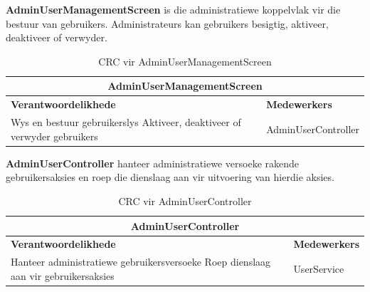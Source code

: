 \textbf{AdminUserManagementScreen} is die administratiewe koppelvlak vir die bestuur van gebruikers. Administrateurs kan gebruikers besigtig, aktiveer, deaktiveer of verwyder.

\begin{table}[H]
\centering
\begin{tabular}{|p{}|p{}|}
    \hline
    \multicolumn{2}{|c|}{\textbf{AdminUserManagementScreen}} \\
    \hline
    \textbf{Verantwoordelikhede} & \textbf{Medewerkers} \\
    \hline
    Wys en bestuur gebruikerslys \newline
    Aktiveer, deaktiveer of verwyder gebruikers
    &
    AdminUserController \\
    \hline
\end{tabular}
\caption{CRC vir AdminUserManagementScreen}
\label{tab:crc_admin_user_management_screen}
\end{table}
\vspace{1em}

\textbf{AdminUserController} hanteer administratiewe versoeke rakende gebruikersaksies en roep die dienslaag aan vir uitvoering van hierdie aksies.

\begin{table}[H]
\centering
\begin{tabular}{|p{}|p{}|}
    \hline
    \multicolumn{2}{|c|}{\textbf{AdminUserController}} \\
    \hline
    \textbf{Verantwoordelikhede} & \textbf{Medewerkers} \\
    \hline
    Hanteer administratiewe gebruikersversoeke \newline
    Roep dienslaag aan vir
    gebruikersaksies &
    UserService \\
    \hline
\end{tabular}
\caption{CRC vir AdminUserController}
\label{tab:crc_admin_user_controller}
\end{table}
\vspace{1em}
